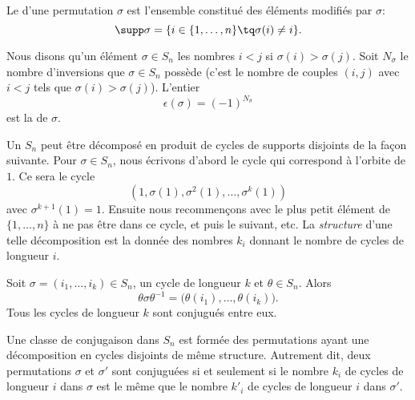 \begin{definition}      \label{DEFooSupportPermutation}
    Le  d'une permutation $\sigma$ est l'ensemble constitué des éléments modifiés par $\sigma$:
    \begin{equation*}
        \supp \sigma = \{ i \in \{1,\ldots,n \} \tq \sigma(i) \neq i\}.
    \end{equation*}
\end{definition}

\begin{definition}  \label{DEFooWPYSooPWuwWO}
    Nous disons qu'un élément \( \sigma \in S_n\)  les nombres \( i<j\) si \( \sigma(i)>\sigma(j)\). Soit \( N_\sigma\) le nombre d'inversions que \( \sigma\in S_n\) possède (c'est le nombre de couples \( (i,j)\) avec \( i<j\) tels que \( \sigma(i)>\sigma(j)\)). L'entier
    \begin{equation}
        \epsilon(\sigma)=(-1)^{N_\sigma}
    \end{equation}
    est la  de \( \sigma\).
\end{definition}

Un  \( S_n\) peut être décomposé en produit de cycles de supports disjoints de la façon suivante. Pour \( \sigma \in S_n \), nous écrivons d'abord le cycle qui correspond à l'orbite de \( 1\). Ce sera le cycle
\begin{equation}
    (1,\sigma(1),\sigma^2(1),\ldots, \sigma^k(1))
\end{equation}
avec \( \sigma^{k+1}(1)=1\). Ensuite nous recommençons avec le plus petit élément de \( \{ 1,\ldots, n \}\) à ne pas être dans ce cycle, et puis le suivant, etc. La \emph{structure} d'une telle décomposition est la donnée des nombres \( k_i\) donnant le nombre de cycles de longueur \( i\).

\begin{lemma}        \label{LemmvZFWP}
    Soit \( \sigma=(i_1,\ldots, i_k)\in S_n\), un cycle de longueur \( k\) et \( \theta\in S_n\). Alors
    \begin{equation}
        \theta\sigma\theta^{-1}=\big( \theta(i_1),\ldots, \theta(i_k) \big).
    \end{equation}
    Tous les cycles de longueur \( k\) sont conjugués entre eux.
\end{lemma}

\begin{proposition} \label{PropEAHWXwe}
    Une classe de conjugaison dans \( S_n\) est formée des permutations ayant une décomposition en cycles disjoints de même structure. Autrement dit, deux permutations \( \sigma\) et \( \sigma'\) sont conjuguées si et seulement si le nombre \( k_i\) de cycles de longueur \( i\) dans \( \sigma\) est le même que le nombre \( k'_i\) de cycles de longueur \( i\) dans \( \sigma'\).
\end{proposition}

